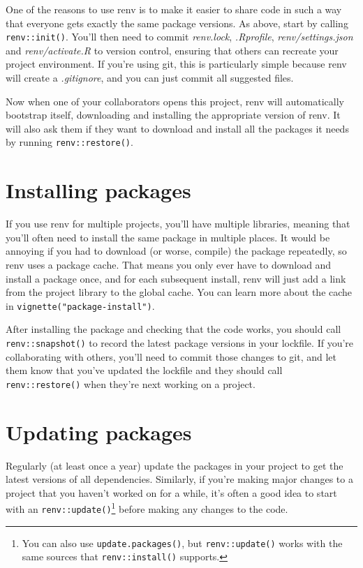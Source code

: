 \documentclass[
  letterpaper,
  DIV=11,
  numbers=noendperiod]{scrreport}
\begin{document}
One of the reasons to use renv is to make it easier to share code in
such a way that everyone gets exactly the same package versions. As
above, start by calling \texttt{renv::init()}. You'll then need to
commit \emph{renv.lock}, \emph{.Rprofile}, \emph{renv/settings.json} and
\emph{renv/activate.R} to version control, ensuring that others can
recreate your project environment. If you're using git, this is
particularly simple because renv will create a \emph{.gitignore}, and
you can just commit all suggested files.

Now when one of your collaborators opens this project, renv will
automatically bootstrap itself, downloading and installing the
appropriate version of renv. It will also ask them if they want to
download and install all the packages it needs by running
\texttt{renv::restore()}.

\section{Installing packages}\label{installing-packages}

If you use renv for multiple projects, you'll have multiple libraries,
meaning that you'll often need to install the same package in multiple
places. It would be annoying if you had to download (or worse, compile)
the package repeatedly, so renv uses a package cache. That means you
only ever have to download and install a package once, and for each
subsequent install, renv will just add a link from the project library
to the global cache. You can learn more about the cache in
\texttt{vignette("package-install")}.

After installing the package and checking that the code works, you
should call \texttt{renv::snapshot()} to record the latest package
versions in your lockfile. If you're collaborating with others, you'll
need to commit those changes to git, and let them know that you've
updated the lockfile and they should call \texttt{renv::restore()} when
they're next working on a project.

\section{Updating packages}\label{updating-packages}

Regularly (at least once a year) update the packages in your project to
get the latest versions of all dependencies. Similarly, if you're making
major changes to a project that you haven't worked on for a while, it's
often a good idea to start with an \texttt{renv::update()}\footnote{You
  can also use \texttt{update.packages()}, but \texttt{renv::update()}
  works with the same sources that \texttt{renv::install()} supports.}
before making any changes to the code.
\end{document}
